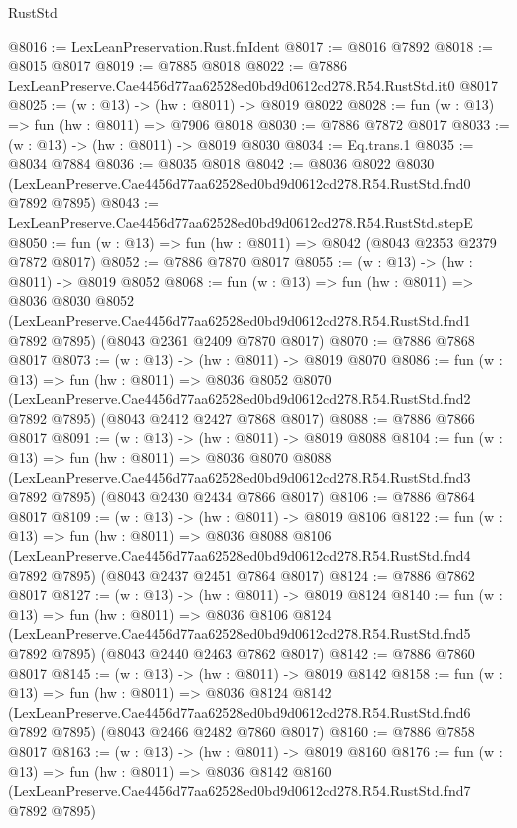 \begin{lexlean}{RustStd}
\begin{coremodule}
@8016 := LexLeanPreservation.Rust.fnIdent
@8017 := @8016 @7892
@8018 := @8015 @8017
@8019 := @7885 @8018
@8022 := @7886 LexLeanPreserve.Cae4456d77aa62528ed0bd9d0612cd278.R54.RustStd.it0 @8017
@8025 := (w : @13) -> (hw : @8011) -> @8019 @8022
@8028 := fun (w : @13) => fun (hw : @8011) => @7906 @8018
@8030 := @7886 @7872 @8017
@8033 := (w : @13) -> (hw : @8011) -> @8019 @8030
@8034 := Eq.trans.{1}
@8035 := @8034 @7884
@8036 := @8035 @8018
@8042 := @8036
    @8022
    @8030
    (LexLeanPreserve.Cae4456d77aa62528ed0bd9d0612cd278.R54.RustStd.fnd0 @7892 @7895)
@8043 := LexLeanPreserve.Cae4456d77aa62528ed0bd9d0612cd278.R54.RustStd.stepE
@8050 := fun (w : @13) => fun (hw : @8011) => @8042 (@8043 @2353 @2379 @7872 @8017)
@8052 := @7886 @7870 @8017
@8055 := (w : @13) -> (hw : @8011) -> @8019 @8052
@8068 := fun (w : @13) =>
  fun (hw : @8011) =>
  @8036
    @8030
    @8052
    (LexLeanPreserve.Cae4456d77aa62528ed0bd9d0612cd278.R54.RustStd.fnd1 @7892 @7895)
    (@8043 @2361 @2409 @7870 @8017)
@8070 := @7886 @7868 @8017
@8073 := (w : @13) -> (hw : @8011) -> @8019 @8070
@8086 := fun (w : @13) =>
  fun (hw : @8011) =>
  @8036
    @8052
    @8070
    (LexLeanPreserve.Cae4456d77aa62528ed0bd9d0612cd278.R54.RustStd.fnd2 @7892 @7895)
    (@8043 @2412 @2427 @7868 @8017)
@8088 := @7886 @7866 @8017
@8091 := (w : @13) -> (hw : @8011) -> @8019 @8088
@8104 := fun (w : @13) =>
  fun (hw : @8011) =>
  @8036
    @8070
    @8088
    (LexLeanPreserve.Cae4456d77aa62528ed0bd9d0612cd278.R54.RustStd.fnd3 @7892 @7895)
    (@8043 @2430 @2434 @7866 @8017)
@8106 := @7886 @7864 @8017
@8109 := (w : @13) -> (hw : @8011) -> @8019 @8106
@8122 := fun (w : @13) =>
  fun (hw : @8011) =>
  @8036
    @8088
    @8106
    (LexLeanPreserve.Cae4456d77aa62528ed0bd9d0612cd278.R54.RustStd.fnd4 @7892 @7895)
    (@8043 @2437 @2451 @7864 @8017)
@8124 := @7886 @7862 @8017
@8127 := (w : @13) -> (hw : @8011) -> @8019 @8124
@8140 := fun (w : @13) =>
  fun (hw : @8011) =>
  @8036
    @8106
    @8124
    (LexLeanPreserve.Cae4456d77aa62528ed0bd9d0612cd278.R54.RustStd.fnd5 @7892 @7895)
    (@8043 @2440 @2463 @7862 @8017)
@8142 := @7886 @7860 @8017
@8145 := (w : @13) -> (hw : @8011) -> @8019 @8142
@8158 := fun (w : @13) =>
  fun (hw : @8011) =>
  @8036
    @8124
    @8142
    (LexLeanPreserve.Cae4456d77aa62528ed0bd9d0612cd278.R54.RustStd.fnd6 @7892 @7895)
    (@8043 @2466 @2482 @7860 @8017)
@8160 := @7886 @7858 @8017
@8163 := (w : @13) -> (hw : @8011) -> @8019 @8160
@8176 := fun (w : @13) =>
  fun (hw : @8011) =>
  @8036
    @8142
    @8160
    (LexLeanPreserve.Cae4456d77aa62528ed0bd9d0612cd278.R54.RustStd.fnd7 @7892 @7895)

\end{coremodule}
\end{lexlean}

